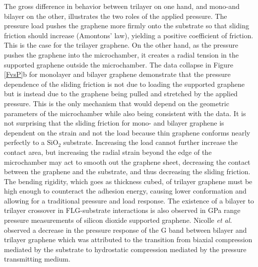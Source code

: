 The gross difference in behavior between trilayer on one hand, and mono-and bilayer on the other, illustrates the two roles of the applied pressure. The pressure load pushes the graphene more firmly onto the substrate so that sliding friction should increase (Amontons' law), yielding a positive coefficient of friction. This is the case for the trilayer graphene.  On the other hand, as the pressure pushes the graphene into the microchamber, it creates a radial tension in the supported graphene outside the microchamber. The data collapse in Figure \ref{FvsP}b for monolayer and bilayer graphene demonstrate that the pressure dependence of the sliding friction is not due to loading the supported graphene but is instead due to the graphene being pulled and stretched by the applied pressure.  This is the only mechanism that would depend on the geometric parameters of the microchamber while also being consistent with the data. It is not surprising that the sliding friction for mono- and bilayer graphene is dependent on the strain and not the load because thin graphene conforms nearly perfectly to a $\mathrm{SiO_2}$ substrate\cite{Stolyarova2007,Lui2009,Cullen2010}.  Increasing the load cannot further increase the contact area, but increasing the radial strain beyond the edge of the microchamber may act to smooth out the graphene sheet, decreasing the contact between the graphene and the substrate, and thus decreasing the sliding friction.  The bending rigidity, which goes as thickness cubed, of trilayer graphene must be high enough to counteract the adhesion energy, causing lower conformation and allowing for a traditional pressure and load response. The existence of a bilayer to trilayer crossover in FLG-substrate interactions is also observed in GPa range pressure measurements of silicon dioxide supported graphene\cite{Proctor2009,Nicolle2011}.  Nicolle \emph{et al.} observed a decrease in the pressure response of the G band between bilayer and trilayer graphene which was attributed to the transition from biaxial compression mediated by the substrate to hydrostatic compression mediated by the pressure transmitting medium\cite{Nicolle2011}.

